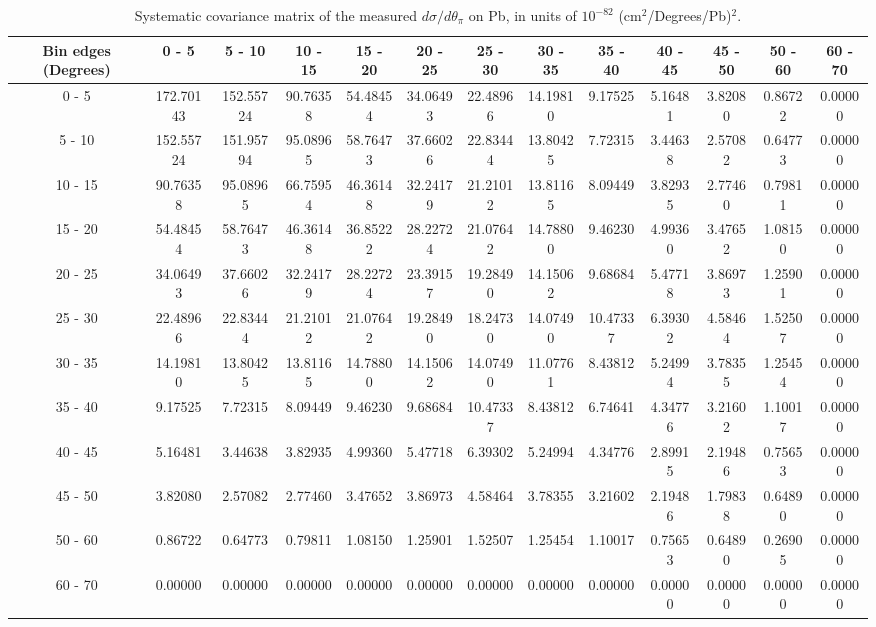 \documentclass[aps,prl,twocolumn,superscriptaddress,nofootinbib]{revtex4-1}
\begin{document}
\begin{turnpage}
 \begin{table}[h!]
  \centering
  \caption{Systematic covariance matrix of the measured $d\sigma/d\theta_{\pi}$ on Pb, in units of $10^{-82}$ (cm$^{2}$/Degrees/Pb)$^{2}$.}
    \begin{tabular}{c||cccccccccccc}
      Bin edges (Degrees) & 0 - 5 & 5 - 10 & 10 - 15 & 15 - 20 & 20 - 25 & 25 - 30 & 30 - 35 & 35 - 40 & 40 - 45 & 45 - 50 & 50 - 60 & 60 - 70 \\
\hline \hline
        0 - 5 & 172.70143 & 152.55724 & 90.76358 & 54.48454 & 34.06493 & 22.48966 & 14.19810 &  9.17525 &  5.16481 &  3.82080 &  0.86722 &  0.00000 \\
       5 - 10 & 152.55724 & 151.95794 & 95.08965 & 58.76473 & 37.66026 & 22.83444 & 13.80425 &  7.72315 &  3.44638 &  2.57082 &  0.64773 &  0.00000 \\
      10 - 15 & 90.76358 & 95.08965 & 66.75954 & 46.36148 & 32.24179 & 21.21012 & 13.81165 &  8.09449 &  3.82935 &  2.77460 &  0.79811 &  0.00000 \\
      15 - 20 & 54.48454 & 58.76473 & 46.36148 & 36.85222 & 28.22724 & 21.07642 & 14.78800 &  9.46230 &  4.99360 &  3.47652 &  1.08150 &  0.00000 \\
      20 - 25 & 34.06493 & 37.66026 & 32.24179 & 28.22724 & 23.39157 & 19.28490 & 14.15062 &  9.68684 &  5.47718 &  3.86973 &  1.25901 &  0.00000 \\
      25 - 30 & 22.48966 & 22.83444 & 21.21012 & 21.07642 & 19.28490 & 18.24730 & 14.07490 & 10.47337 &  6.39302 &  4.58464 &  1.52507 &  0.00000 \\
      30 - 35 & 14.19810 & 13.80425 & 13.81165 & 14.78800 & 14.15062 & 14.07490 & 11.07761 &  8.43812 &  5.24994 &  3.78355 &  1.25454 &  0.00000 \\
      35 - 40 &  9.17525 &  7.72315 &  8.09449 &  9.46230 &  9.68684 & 10.47337 &  8.43812 &  6.74641 &  4.34776 &  3.21602 &  1.10017 &  0.00000 \\
      40 - 45 &  5.16481 &  3.44638 &  3.82935 &  4.99360 &  5.47718 &  6.39302 &  5.24994 &  4.34776 &  2.89915 &  2.19486 &  0.75653 &  0.00000 \\
      45 - 50 &  3.82080 &  2.57082 &  2.77460 &  3.47652 &  3.86973 &  4.58464 &  3.78355 &  3.21602 &  2.19486 &  1.79838 &  0.64890 &  0.00000 \\
      50 - 60 &  0.86722 &  0.64773 &  0.79811 &  1.08150 &  1.25901 &  1.52507 &  1.25454 &  1.10017 &  0.75653 &  0.64890 &  0.26905 &  0.00000 \\
      60 - 70 &  0.00000 &  0.00000 &  0.00000 &  0.00000 &  0.00000 &  0.00000 &  0.00000 &  0.00000 &  0.00000 &  0.00000 &  0.00000 &  0.00000 \\
    \end{tabular}
  \label{tablecov:Pb_Systematic_ThetaPi}
  \end{table}
\end{turnpage}
\end{document}
